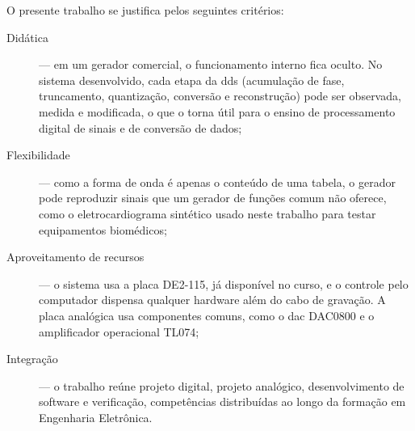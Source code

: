 O presente trabalho se justifica pelos seguintes critérios:
\begin{description}
	\item[Didática] --- em um gerador comercial, o funcionamento interno fica oculto. No sistema desenvolvido, cada etapa da \ac{dds} (acumulação de fase, truncamento, quantização, conversão e reconstrução) pode ser observada, medida e modificada, o que o torna útil para o ensino de processamento digital de sinais e de conversão de dados;
	\item[Flexibilidade] --- como a forma de onda é apenas o conteúdo de uma tabela, o gerador pode reproduzir sinais que um gerador de funções comum não oferece, como o eletrocardiograma sintético usado neste trabalho para testar equipamentos biomédicos;
	\item[Aproveitamento de recursos] --- o sistema usa a placa DE2-115, já disponível no curso, e o controle pelo computador dispensa qualquer hardware além do cabo de gravação. A placa analógica usa componentes comuns, como o \ac{dac} DAC0800 e o amplificador operacional TL074;
	\item[Integração] --- o trabalho reúne projeto digital, projeto analógico, desenvolvimento de software e verificação, competências distribuídas ao longo da formação em Engenharia Eletrônica.
\end{description}
